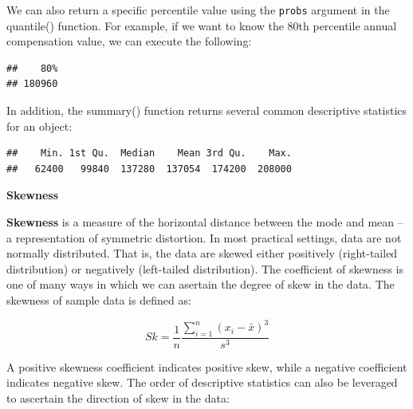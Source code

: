 \documentclass[]{book}
\newenvironment{Shaded}{\begin{snugshade}}{\end{snugshade}}
\newcommand{\CommentTok}[1]{\textcolor[rgb]{0.56,0.35,0.01}{\textit{#1}}}
\newcommand{\DataTypeTok}[1]{\textcolor[rgb]{0.13,0.29,0.53}{#1}}
\newcommand{\FloatTok}[1]{\textcolor[rgb]{0.00,0.00,0.81}{#1}}
\newcommand{\KeywordTok}[1]{\textcolor[rgb]{0.13,0.29,0.53}{\textbf{#1}}}
\newcommand{\NormalTok}[1]{#1}
\newcommand{\OperatorTok}[1]{\textcolor[rgb]{0.81,0.36,0.00}{\textbf{#1}}}
\begin{document}
We can also return a specific percentile value using the \texttt{probs} argument in the quantile() function. For example, if we want to know the 80th percentile annual compensation value, we can execute the following:

\begin{Shaded}
\end{Shaded}

\begin{verbatim}
##    80% 
## 180960
\end{verbatim}

In addition, the summary() function returns several common descriptive statistics for an object:

\begin{Shaded}
\end{Shaded}

\begin{verbatim}
##    Min. 1st Qu.  Median    Mean 3rd Qu.    Max. 
##   62400   99840  137280  137054  174200  208000
\end{verbatim}

\textbf{Skewness}

\textbf{Skewness} is a measure of the horizontal distance between the mode and mean -- a representation of symmetric distortion. In most practical settings, data are not normally distributed. That is, the data are skewed either positively (right-tailed distribution) or negatively (left-tailed distribution). The coefficient of skewness is one of many ways in which we can asertain the degree of skew in the data. The skewness of sample data is defined as:

\[ Sk = \frac{1}{n} \frac{\displaystyle\sum_{i=1}^{n} (x_i-\bar{x})^3}{s^3} \]

A positive skewness coefficient indicates positive skew, while a negative coefficient indicates negative skew. The order of descriptive statistics can also be leveraged to ascertain the direction of skew in the data:
\end{document}
